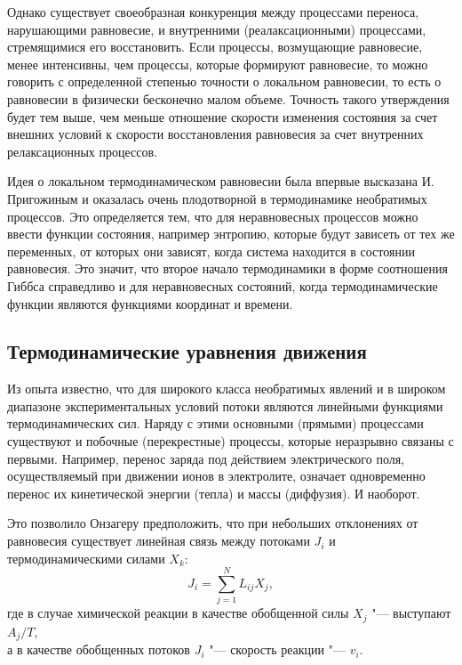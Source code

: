 \documentclass[12pt,a4paper,oneside]{book}
\begin{document}
Однако существует своеобразная конкуренция между процессами переноса, нарушающими равновесие, и внутренними (реалаксационными) процессами, стремящимися его восстановить. Если процессы, возмущающие равновесие, менее интенсивны, чем процессы, которые формируют равновесие, то можно говорить с определенной степенью точности о локальном равновесии, то есть о равновесии в физически бесконечно малом объеме. Точность такого утверждения  будет тем выше, чем меньше отношение скорости изменения состояния за счет внешних условий к скорости восстановления равновесия за счет внутренних релаксационных процессов.

Идея о локальном термодинамическом равновесии была впервые высказана И.\,При\-го\-жи\-ным и оказалась очень плодотворной в термодинамике необратимых процессов. Это определяется тем, что для неравновесных процессов можно ввести функции состояния, например энтропию, которые будут зависеть от тех же переменных, от которых они зависят, когда система находится в состоянии равновесия. Это значит, что второе начало термодинамики в форме соотношения Гиббса справедливо и для неравновесных состояний, когда термодинамические функции являются функциями координат и времени.


\subsection{Термодинамические уравнения движения}

Из опыта известно, что для широкого класса необратимых явлений и в широком диапазоне экспериментальных условий потоки являются линейными функциями термодинамических сил. Наряду с этими основными (прямыми) процессами существуют и побочные (перекрестные) процессы, которые неразрывно связаны с первыми. Например, перенос заряда под действием электрического поля, осуществляемый при движении ионов в электролите, означает одновременно перенос их кинетической энергии (тепла) и массы (диффузия). И наоборот. 

Это позволило Онзагеру предположить, что при небольших отклонениях от равновесия существует линейная связь между потоками  $J_i$ и термодинамическими  силами $X_k$:   
\begin{equation}
	J_i = \sum_{j=1}^{N} L_{ij} X_j,
\end{equation}
где в случае химической реакции в качестве обобщенной силы $X_j$ "--- выступают $A_j/T$,\\
а в качестве обобщенных потоков $J_i$ "--- скорость реакции "--- $v_i$.
\end{document}
